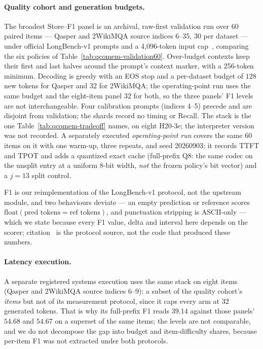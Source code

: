 \documentclass{article}
\begin{document}
\paragraph{Quality cohort and generation budgets.}
The broadest Store--F1 panel is an archival, raw-first validation run over 60
paired items --- Qasper and 2WikiMQA source indices 6--35, 30 per dataset ---
under official LongBench-v1 prompts and a 4,096-token input
cap~\citep{bai2024longbench,dasigi2021qasper,ho2020multihopqa}, comparing the
six policies of Table~\ref{tab:qcomem-validation60}.  Over-budget contexts keep
their first and last halves around the prompt's context marker, with a 256-token
minimum.  Decoding is greedy with an EOS stop and a per-dataset budget of $128$
new tokens for Qasper and $32$ for 2WikiMQA; the operating-point run uses the
same budget and the eight-item panel $32$ for both, so the three panels' F1
levels are not interchangeable.  Four calibration prompts (indices 4--5) precede
and are disjoint from validation; the shards record no timing or Recall.  The stack is the one Table~\ref{tab:qcomem-tradeoff} names, on eight
H20-3e; the interpreter version was not recorded.  A separately executed
\emph{operating-point run} covers the same 60 items on it with one warm-up,
three repeats, and seed 20260903; it records TTFT and TPOT and adds a quantized
exact cache (full-prefix Q8: the same codec on the unsplit entry at a uniform
8-bit width, \emph{not} the frozen policy's bit vector) and a $j=13$ split
control.

F1 is our reimplementation of the LongBench-v1  protocol, not
the upstream module, and two behaviours deviate --- an empty prediction or
reference scores $\mathrm{float}(\text{pred tokens}=\text{ref tokens})$, and
punctuation stripping is ASCII-only --- which we state because every F1 value,
delta and interval here depends on the scorer; citation~\citep{bai2024longbenchcode}
is the protocol source, not the code that produced these numbers.

\paragraph{Latency execution.}
A separate registered systems execution uses the same stack on eight items
(Qasper and 2WikiMQA source indices 6--9): a subset of the quality cohort's
\emph{items} but not of its measurement protocol, since it caps every arm at $32$
generated tokens.  That is why its full-prefix F1 reads $39.14$ against those
panels' $54.68$ and $54.67$ on a superset of the same items; the levels are not
comparable, and we do not decompose the gap into budget and item-difficulty
shares, because per-item F1 was not extracted under both protocols.
\end{document}
